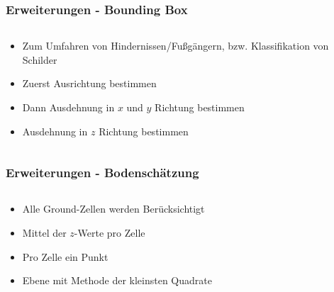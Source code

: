 \begin{frame}
    \frametitle{Erweiterungen - Bounding Box}
    \begin{columns}
        \begin{column}{.5\textwidth}
            \begin{itemize}
                \item Zum Umfahren von Hindernissen/Fußgängern, bzw. Klassifikation von Schilder 
                \item<2-> Zuerst Ausrichtung bestimmen
                \item<3-> Dann Ausdehnung in $x$ und $y$ Richtung bestimmen
                \item<4-> Ausdehnung in $z$ Richtung bestimmen
            \end{itemize}
        \end{column}
        \begin{column}{.5\textwidth}
            
        \end{column}
    \end{columns}
\end{frame}

\begin{frame}
    \frametitle{Erweiterungen - Bodenschätzung}
    \begin{columns}
        \begin{column}{.5\textwidth}
            \begin{itemize}
                \item Alle Ground-Zellen werden Berücksichtigt
                \item<2-> Mittel der $z$-Werte pro Zelle
                \item<3-> Pro Zelle ein Punkt
                \item<4-> Ebene mit Methode der kleinsten Quadrate
            \end{itemize}
        \end{column}
        \begin{column}{.5\textwidth}
            
        \end{column}
    \end{columns}
\end{frame}
